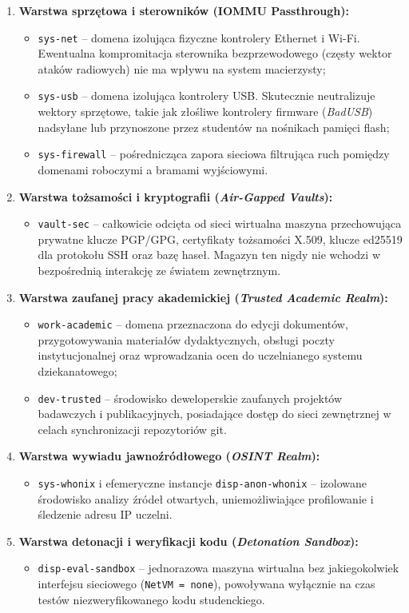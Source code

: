 \begin{enumerate}
    \item \textbf{Warstwa sprzętowa i sterowników (IOMMU Passthrough):}
    \begin{itemize}
        \item \texttt{sys-net} -- domena izolująca fizyczne kontrolery Ethernet i Wi-Fi. Ewentualna kompromitacja sterownika bezprzewodowego (częsty wektor ataków radiowych) nie ma wpływu na system macierzysty;
        \item \texttt{sys-usb} -- domena izolująca kontrolery USB. Skutecznie neutralizuje wektory sprzętowe, takie jak złośliwe kontrolery firmware (\textit{BadUSB}) nadsyłane lub przynoszone przez studentów na nośnikach pamięci flash;
        \item \texttt{sys-firewall} -- pośrednicząca zapora sieciowa filtrująca ruch pomiędzy domenami roboczymi a bramami wyjściowymi.
    \end{itemize}
    \item \textbf{Warstwa tożsamości i kryptografii (\textit{Air-Gapped Vaults}):}
    \begin{itemize}
        \item \texttt{vault-sec} -- całkowicie odcięta od sieci wirtualna maszyna przechowująca prywatne klucze PGP/GPG, certyfikaty tożsamości X.509, klucze ed25519 dla protokołu SSH oraz bazę haseł. Magazyn ten nigdy nie wchodzi w bezpośrednią interakcję ze światem zewnętrznym.
    \end{itemize}
    \item \textbf{Warstwa zaufanej pracy akademickiej (\textit{Trusted Academic Realm}):}
    \begin{itemize}
        \item \texttt{work-academic} -- domena przeznaczona do edycji dokumentów, przygotowywania materiałów dydaktycznych, obsługi poczty instytucjonalnej oraz wprowadzania ocen do uczelnianego systemu dziekanatowego;
        \item \texttt{dev-trusted} -- środowisko deweloperskie zaufanych projektów badawczych i publikacyjnych, posiadające dostęp do sieci zewnętrznej w celach synchronizacji repozytoriów git.
    \end{itemize}
    \item \textbf{Warstwa wywiadu jawnoźródłowego (\textit{OSINT Realm}):}
    \begin{itemize}
        \item \texttt{sys-whonix} i efemeryczne instancje \texttt{disp-anon-whonix} -- izolowane środowisko analizy źródeł otwartych, uniemożliwiające profilowanie i śledzenie adresu IP uczelni.
    \end{itemize}
    \item \textbf{Warstwa detonacji i weryfikacji kodu (\textit{Detonation Sandbox}):}
    \begin{itemize}
        \item \texttt{disp-eval-sandbox} -- jednorazowa maszyna wirtualna bez jakiegokolwiek interfejsu sieciowego (\texttt{NetVM = none}), powoływana wyłącznie na czas testów niezweryfikowanego kodu studenckiego.
    \end{itemize}
\end{enumerate}

